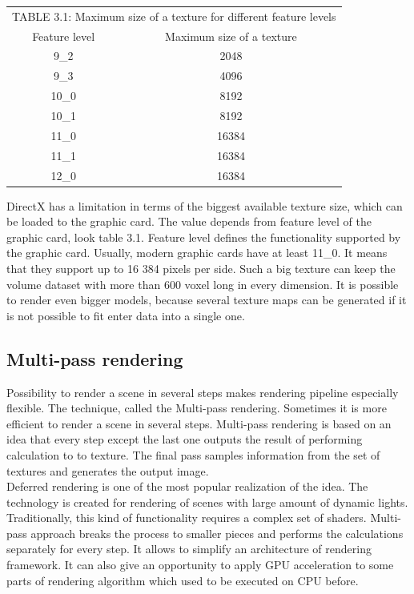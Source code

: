 \documentclass[twoside, english, 11pt]{report}
\begin{document}
\begin{table}[!h]
 \begin{center}
    \begin{tabular}{ c  c }
    \multicolumn{2}{l}{TABLE 3.1: Maximum size of a texture for different feature levels \label{tab:level}}\\
    Feature level & Maximum size of a texture\\
    \hline
    9\_2 & 2048\\
    9\_3 & 4096\\
    10\_0 & 8192\\
    10\_1 & 8192\\
    11\_0 & 16384\\
    11\_1 & 16384\\
    12\_0 & 16384\\
    \end{tabular}

  \end{center}
\end{table}
DirectX has a limitation in terms of the biggest available texture size, which can be loaded to the graphic card. The value depends from feature level of the graphic card, look table 3.1. Feature level defines the functionality supported by the graphic card. Usually, modern graphic cards have at least 11\_0. It means that they support up to 16 384 pixels per side. Such a big texture can keep the volume dataset with more than 600 voxel long in every dimension. It is possible to render even bigger models, because several texture maps can be generated if it is not possible to fit enter data into a single one.\\

\subsection{Multi-pass rendering}

Possibility to render a scene in several steps makes rendering pipeline especially flexible. The technique, called the Multi-pass rendering. Sometimes it is more efficient to render a scene in several steps. Multi-pass rendering is based on an idea that every step except the last one outputs the result of performing calculation to to texture. The final pass samples information from the set of textures and generates the output image.\\

Deferred rendering is one of the most popular realization of the idea. The technology is created for rendering of scenes with large amount of dynamic lights. Traditionally, this kind of functionality requires a complex set of shaders. Multi-pass approach breaks the process to smaller pieces and performs the calculations separately for every step. It allows to simplify an architecture of rendering framework. It can also give an opportunity to apply GPU acceleration to some parts of rendering algorithm which used to be executed on CPU before.\\
\end{document}
